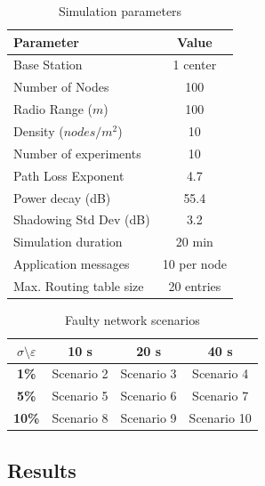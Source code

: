 \begin{table}[!ht]
\centering
\caption{Simulation parameters}
\label{tab:conf}
\begin{tabular}{@{}lc@{}}
\toprule
\multicolumn{1}{l}{\textbf{Parameter}} & \textbf{Value} \\ \midrule
Base Station                           & 1 center       \\
Number of Nodes                        & 100            \\
Radio Range ($m$)                      & 100            \\
Density ($nodes/m^{2}$)                & 10             \\
Number of experiments                  & 10             \\
Path Loss Exponent                     & 4.7            \\
Power decay (dB)                       & 55.4           \\
Shadowing Std Dev (dB)                 & 3.2            \\
Simulation duration                    & 20 min            \\
Application messages                   & 10 per node \\
Max. Routing table size                & 20 entries \\
\bottomrule
\end{tabular}
\end{table}



\begin{table}[!ht]
\centering
\caption{Faulty network scenarios}
\label{tab:scn}
\begin{tabular}{|c|c|c|c|}
\hline
\textbf{$\sigma$$\setminus$$\varepsilon$} & \textbf{10 s} & \textbf{20 s} & \textbf{40 s}\\ \hline
\textbf{1\%}     & Scenario 2            & Scenario 3        & Scenario 4              \\ \hline
\textbf{5\%}     & Scenario 5            & Scenario 6        & Scenario 7             \\ \hline
\textbf{10\%}    & Scenario 8            & Scenario 9        & Scenario 10              \\ \hline
\end{tabular}
\end{table}


\subsection{Results}\label{subsec:res}

